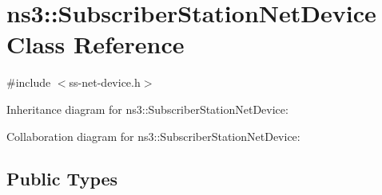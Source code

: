 \hypertarget{classns3_1_1SubscriberStationNetDevice}{}\section{ns3\+:\+:Subscriber\+Station\+Net\+Device Class Reference}
\label{classns3_1_1SubscriberStationNetDevice}


{\ttfamily \#include $<$ss-\/net-\/device.\+h$>$}



Inheritance diagram for ns3\+:\+:Subscriber\+Station\+Net\+Device\+:


Collaboration diagram for ns3\+:\+:Subscriber\+Station\+Net\+Device\+:
\subsection*{Public Types}
